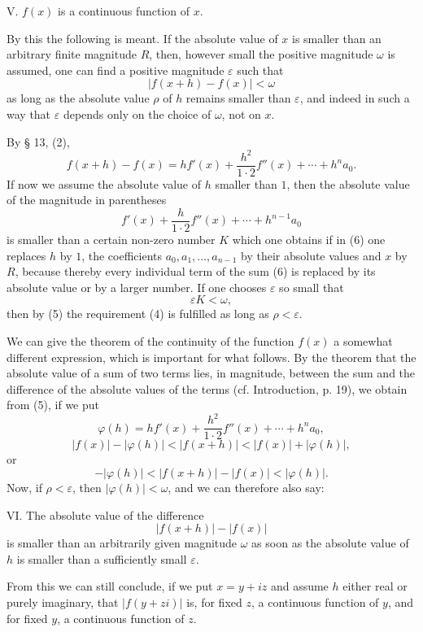 \documentclass[11pt]{article}
\begin{document}
\medskip
\noindent V. $f(x)$ is a continuous function of $x$.
\medskip

By this the following is meant. If the absolute value of $x$ is smaller than an arbitrary finite magnitude $R$, then, however small the positive magnitude $\omega$ is assumed, one can find a positive magnitude $\varepsilon$ such that
\begin{equation}
 |f(x+h)-f(x)|<\omega
\tag{4}
\end{equation}
as long as the absolute value $\rho$ of $h$ remains smaller than $\varepsilon$, and indeed in such a way that $\varepsilon$ depends only on the choice of $\omega$, not on $x$.

By § 13, (2),
\begin{equation}
 f(x+h)-f(x)=h f'(x)+\frac{h^2}{1\cdot2}f''(x)+\cdots+h^n a_0.
\tag{5}
\end{equation}
If now we assume the absolute value of $h$ smaller than $1$, then the absolute value of the magnitude in parentheses
\begin{equation}
 f'(x)+\frac{h}{1\cdot2}f''(x)+\cdots+h^{n-1}a_0
\tag{6}
\end{equation}
is smaller than a certain non-zero number $K$ which one obtains if in (6) one replaces $h$ by $1$, the coefficients $a_0,a_1,\ldots,a_{n-1}$ by their absolute values and $x$ by $R$, because thereby every individual term of the sum (6) is replaced by its absolute value or by a larger number. If one chooses $\varepsilon$ so small that
\[
 \varepsilon K<\omega,
\]
then by (5) the requirement (4) is fulfilled as long as $\rho<\varepsilon$.

We can give the theorem of the continuity of the function $f(x)$ a somewhat different expression, which is important for what follows. By the theorem that the absolute value of a sum of two terms lies, in magnitude, between the sum and the difference of the absolute values of the terms (cf. Introduction, p. 19), we obtain from (5), if we put
\[
 \varphi(h)=h f'(x)+\frac{h^2}{1\cdot2}f''(x)+\cdots+h^n a_0,
\]
\[
 |f(x)|-|\varphi(h)|<|f(x+h)|<|f(x)|+|\varphi(h)|,
\]
or
\[
 -|\varphi(h)|<|f(x+h)|-|f(x)|<|\varphi(h)|.
\]
Now, if $\rho<\varepsilon$, then $|\varphi(h)|<\omega$, and we can therefore also say:

\medskip
\noindent VI. The absolute value of the difference
\[
 |f(x+h)|-|f(x)|
\]
is smaller than an arbitrarily given magnitude $\omega$ as soon as the absolute value of $h$ is smaller than a sufficiently small $\varepsilon$.
\medskip

From this we can still conclude, if we put $x=y+iz$ and assume $h$ either real or purely imaginary, that $|f(y+zi)|$ is, for fixed $z$, a continuous function of $y$, and for fixed $y$, a continuous function of $z$.
\end{document}
